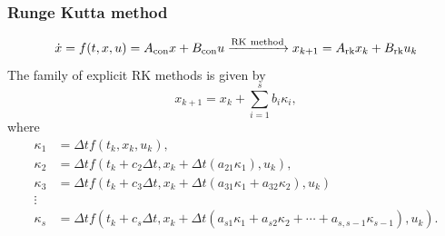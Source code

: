 \documentclass[student, noshadow, lsr, english, aspectratio=169]{ITR_LSR_slides}
\begin{document}
\begin{frame}
	\frametitle{Runge Kutta method}
$$
\dot{x} = f(t,x,u) = A_{\rm {con}}x + B_{\rm {con}}u \xrightarrow{\text{RK}\ \text{method}} x_{k+1}= A_{\rm{rk}}x_k + B_{\rm{rk}}u_k
$$
The family of explicit RK methods is given by %
\begin{equation}
	x_{k+1} = x_k +  \sum_{i=1}^s b_i \kappa_i,
\end{equation}
where
\begin{equation}
	\begin{split}
		\kappa_1 &= \Delta t f(t_k,x_k,u_k),\\
		\kappa_2 &= \Delta t f(t_k+c_2\Delta t, x_k+\Delta t(a_{21}\kappa_1),u_k),\\
		\kappa_3 &= \Delta t f(t_k+c_3\Delta t, x_k+\Delta t(a_{31}\kappa_1+a_{32}\kappa_2),u_k)\\
		\vdots\\
		\kappa_s &= \Delta t f(t_k+c_s\Delta t,  x_k+\Delta t(a_{s1}\kappa_1+a_{s2}\kappa_2+\cdots+a_{s,s-1}\kappa_{s-1}),u_k).
	\end{split}
\end{equation}

\end{frame}
\end{document}
